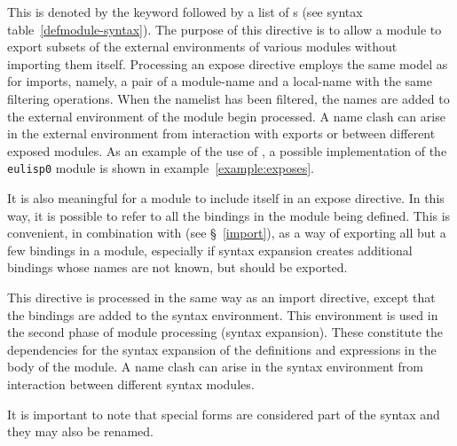 \begin{optDefinition}
This is denoted by the keyword  followed by a list of
s (see syntax table~\ref{defmodule-syntax}).  The
purpose of this directive is to allow a module to export subsets of the external
environments of various modules without importing them itself.  Processing an
expose directive employs the same model as for imports, namely, a pair of a
module-name and a local-name with the same filtering operations.  When the
namelist has been filtered, the names are added to the external environment of
the module begin processed.  A name clash can arise in the external environment
from interaction with exports or between different exposed modules.  As an
example of the use of , a possible implementation of the {\tt
    eulisp0}  module is shown in
example~\ref{example:exposes}.
%
\begin{example}
\label{example:exposes}
\end{example}
%
It is also meaningful for a module to include itself in an expose
directive.  In this way, it is possible to refer to all the bindings
in the module being defined.  This is convenient, in combination with
 (see \S~\ref{import}), as a way of exporting all but
a few bindings in a module, especially if syntax expansion creates
additional bindings whose names are not known, but should be exported.
\end{optDefinition}
%
\label{syntax-directive}
\begin{optDefinition}
This directive is processed in the same way as an import directive,
except that the bindings are added to the syntax environment.  This
environment is used in the second phase of module processing (syntax
expansion).  These constitute the dependencies for the syntax expansion
of the definitions and expressions in the body of the module.  A name
clash can arise in the syntax environment from interaction between
different syntax modules.

It is important to note that special forms are considered part of the
syntax and they may also be renamed.
\end{optDefinition}

